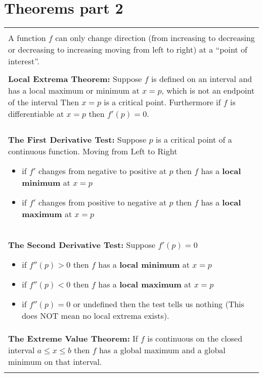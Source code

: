 \documentclass[12pt]{report}
\newenvironment{boxe}
    {\begin{center}
    \begin{tabular}{|p{0.9\textwidth}|}
    \hline\\
    }
    { 
    \\\\\hline
    \end{tabular} 
    \end{center}
    }
\begin{document}
\section*{Theorems part 2}
\begin{boxe}
    A function $f$ can only change direction (from increasing to decreasing or decreasing to increasing moving from left to right) at a ``point of interest''.\\\\

    \textbf{Local Extrema Theorem:} Suppose $f$ is defined on an interval and has a local maximum or minimum at $x=p$, which is not an endpoint of the interval Then $x=p$ is a critical point. Furthermore if $f$ is differentiable at $x=p$ then $f'(p)=0$.\\\\
    
    \textbf{The First Derivative Test:} Suppose $p$ is a critical point of a continuous function. Moving from Left to Right
    \begin{itemize}
        \item if $f'$ changes from negative to positive at $p$ then $f$ has a \textbf{local minimum} at $x=p$
        \item if $f'$ changes from positive to negative at $p$ then $f$ has a \textbf{local maximum} at $x=p$
    \end{itemize}\\

    \textbf{The Second Derivative Test:} Suppose $f'(p)=0$
    \begin{itemize}
        \item if $f''(p)>0$ then $f$ has a \textbf{local minimum} at $x=p$
        \item if $f''(p)<0$ then $f$ has a \textbf{local maximum} at $x=p$
        \item if $f''(p)=0$ or undefined then the test tells us nothing (This does NOT mean no local extrema exists).
    \end{itemize}\\

    \textbf{The Extreme Value Theorem:} If $f$ is continuous on the closed interval $a\leq x\leq b$ then $f$ has a global maximum and a global minimum on that interval.
\end{boxe}
\end{document}
